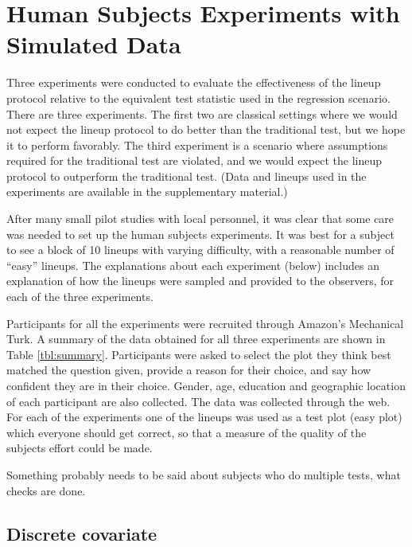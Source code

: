 \documentclass{article}
\newcommand{\green}[1]{{\color{green} #1}} %
\begin{document}
\section{Human Subjects Experiments with Simulated Data} \label{sec:simulation}

Three experiments were conducted to evaluate the effectiveness of the lineup protocol relative to the equivalent test statistic used in the regression scenario. There are three experiments. The first two are classical settings where we would not expect the lineup protocol to do better than the traditional test, but we hope it to perform favorably. The third experiment is a scenario where assumptions required for the traditional test are violated, and we would expect the lineup protocol to outperform the traditional test. (Data and lineups used in the experiments are available in the supplementary material.)

After many small pilot studies with local personnel, it was clear that some care was needed to set up the human subjects experiments. It was best for a subject to see a block of 10 lineups with varying difficulty, with a reasonable number of ``easy'' lineups. The explanations about each experiment (below) includes an explanation of how the lineups were sampled and provided to the observers, for each of the three experiments.

Participants for all the experiments were recruited through \cite{turk} Amazon's Mechanical Turk. A summary of the data obtained for all three experiments are shown in Table \ref{tbl:summary}. Participants were asked to select the plot they think best matched the question given, provide a reason for their choice, and say how confident they are in their choice. Gender, age, education and geographic location of each participant are also collected. The data was collected through the web. For each of the experiments one of the lineups was used as a test plot (easy plot) which everyone should get correct, so that a measure of the quality of the subjects effort could be made. 

\green{Something probably needs to be said about subjects who do multiple tests, what checks are done.}

\subsection{Discrete covariate}\label{sec:category}
\end{document}
